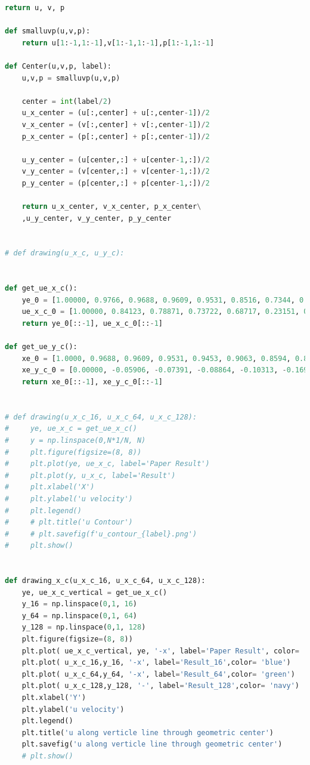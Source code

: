 \documentclass[12pt]{article}
\begin{document}
\begin{scriptsize}
\begin{lstlisting}[language=python,caption={Post Operator:}]
    return u, v, p

def smalluvp(u,v,p):
    return u[1:-1,1:-1],v[1:-1,1:-1],p[1:-1,1:-1] 

def Center(u,v,p, label):
    u,v,p = smalluvp(u,v,p)
    
    center = int(label/2)
    u_x_center = (u[:,center] + u[:,center-1])/2
    v_x_center = (v[:,center] + v[:,center-1])/2
    p_x_center = (p[:,center] + p[:,center-1])/2

    u_y_center = (u[center,:] + u[center-1,:])/2
    v_y_center = (v[center,:] + v[center-1,:])/2
    p_y_center = (p[center,:] + p[center-1,:])/2

    return u_x_center, v_x_center, p_x_center\
    ,u_y_center, v_y_center, p_y_center


# def drawing(u_x_c, u_y_c):
    
    
def get_ue_x_c():
    ye_0 = [1.00000, 0.9766, 0.9688, 0.9609, 0.9531, 0.8516, 0.7344, 0.6172, 0.5000, 0.4531, 0.2813, 0.1719, 0.1016, 0.0703, 0.0625, 0.0547, 0.0000]
    ue_x_c_0 = [1.00000, 0.84123, 0.78871, 0.73722, 0.68717, 0.23151, 0.00332, -0.13641, -0.20581, -0.21090, -0.15662, -0.10150, -0.06434, -0.04775, -0.04192, -0.03717, 0.00000]
    return ye_0[::-1], ue_x_c_0[::-1]

def get_ue_y_c():
    xe_0 = [1.0000, 0.9688, 0.9609, 0.9531, 0.9453, 0.9063, 0.8594, 0.8047, 0.5000, 0.2344, 0.2266, 0.1563, 0.0938, 0.0781, 0.0703, 0.0625, 0.0000]
    xe_y_c_0 = [0.00000, -0.05906, -0.07391, -0.08864, -0.10313, -0.16914, -0.22445, -0.24533, 0.05454, 0.17527, 0.17507, 0.16077, 0.12317, 0.10890, 0.10091, 0.09233, 0.00000]
    return xe_0[::-1], xe_y_c_0[::-1]


# def drawing(u_x_c_16, u_x_c_64, u_x_c_128):
#     ye, ue_x_c = get_ue_x_c()
#     y = np.linspace(0,N*1/N, N)
#     plt.figure(figsize=(8, 8))
#     plt.plot(ye, ue_x_c, label='Paper Result')
#     plt.plot(y, u_x_c, label='Result')
#     plt.xlabel('X')
#     plt.ylabel('u velocity')
#     plt.legend()
#     # plt.title('u Contour')
#     # plt.savefig(f'u_contour_{label}.png')
#     plt.show()


def drawing_x_c(u_x_c_16, u_x_c_64, u_x_c_128):
    ye, ue_x_c_vertical = get_ue_x_c()
    y_16 = np.linspace(0,1, 16)
    y_64 = np.linspace(0,1, 64)
    y_128 = np.linspace(0,1, 128)
    plt.figure(figsize=(8, 8))
    plt.plot( ue_x_c_vertical, ye, '-x', label='Paper Result', color= 'red')
    plt.plot( u_x_c_16,y_16, '-x', label='Result_16',color= 'blue')
    plt.plot( u_x_c_64,y_64, '-x', label='Result_64',color= 'green')
    plt.plot( u_x_c_128,y_128, '-', label='Result_128',color= 'navy')
    plt.xlabel('Y')
    plt.ylabel('u velocity')
    plt.legend()
    plt.title('u along verticle line through geometric center')
    plt.savefig('u along verticle line through geometric center')
    # plt.show()




\end{lstlisting}
\end{scriptsize}
\end{document}
